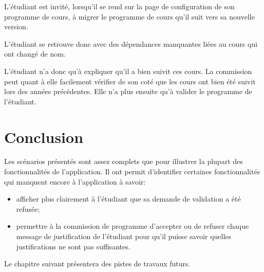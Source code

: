 L'étudiant est invité, lorsqu'il se rend sur la page de configuration de son programme de cours, à migrer le programme de cours qu'il suit vers sa nouvelle version.

L'étudiant se retrouve donc avec des dépendances manquantes liées au cours qui ont changé de nom. 

L'étudiant n'a donc qu'à expliquer qu'il a bien suivit ces cours. La commission peut quant à elle facilement vérifier de son coté que les cours ont bien été suivit lors des années précédentes. Elle n'a plus ensuite qu'à valider le programme de l'étudiant. 


\section{Conclusion}

Les scénarios présentés sont assez complets que pour illustrer la plupart des fonctionnalités de l'application. Il ont permit d'identifier certaines fonctionnalités qui manquent encore à l'application à savoir:
\begin{itemize}
\item afficher plus clairement à l'étudiant que sa demande de validation a été refusée;
\item permettre à la commission de programme d'accepter ou de refuser chaque message de justification de l'étudiant pour qu'il puisse savoir quelles justifications ne sont pas suffisantes.
\end{itemize}

Le chapitre suivant présentera des pistes de travaux futurs. 